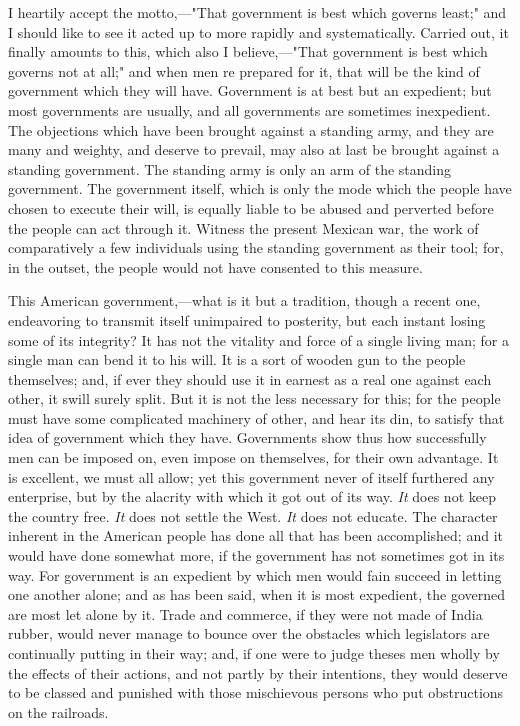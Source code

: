 I heartily accept the motto,---"That government is best which governs
least;" and I should like to see it acted up to more rapidly and
systematically.  Carried out, it finally amounts to this, which also I
believe,---"That government is best which governs not at all;" and when
men re prepared for it, that will be the kind of government which they
will have. Government is at best but an expedient; but most
governments are usually, and all governments are sometimes
inexpedient. The objections which have been brought against a standing
army, and they are many and weighty, and deserve to prevail, may also
at last be brought against a standing government. The standing army is
only an arm of the standing government. The government itself, which
is only the mode which the people have chosen to execute their will,
is equally liable to be abused and perverted before the people can act
through it. Witness the present Mexican war, the work of comparatively
a few individuals using the standing government as their tool; for, in
the outset, the people would not have consented to this measure.\par 


This American government,---what is it but a tradition, though a
recent one, endeavoring to transmit itself unimpaired to posterity,
but each instant losing some of its integrity? It has not the vitality
and force of a single living man; for a single man can bend it to his
will. It is a sort of wooden gun to the people themselves; and, if
ever they should use it in earnest as a real one against each other,
it swill surely split. But it is not the less necessary for this; for
the people must have some complicated machinery of other, and hear its
din, to satisfy that idea of government which they have. Governments
show thus how successfully men can be imposed on, even impose on
themselves, for their own advantage. It is excellent, we must all
allow; yet this government never of itself furthered any enterprise,
but by the alacrity with which it got out of its way. {\sl It} does
not keep the country free. {\sl It} does not settle the West. {\sl It}
does not educate.  The character inherent in the  American people has
done all that has been accomplished; and it would have done somewhat
more, if the government has not sometimes got in its way. For
government is an expedient by which men would fain succeed in letting
one another alone; and as has been said, when it is most expedient,
the governed are most let alone by it. Trade and commerce, if they
were not made of India rubber, would never manage to bounce over the
obstacles which legislators are continually putting in their way; and,
if one were to judge theses men wholly by the effects of their
actions, and not partly by their intentions, they would deserve to be
classed and punished with those mischievous persons who put
obstructions on the railroads.\par

